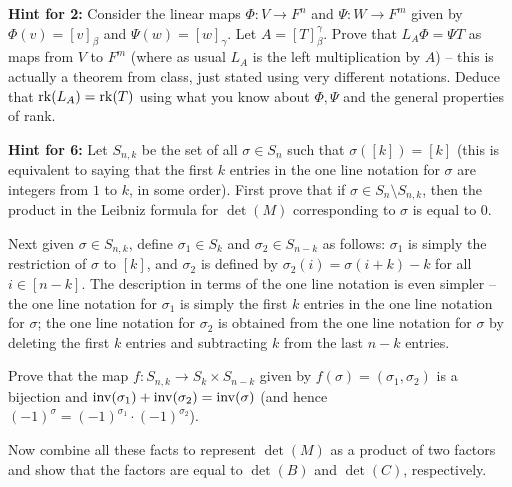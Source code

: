 \documentclass[11pt]{amsart}
\begin{document}
\newpage
{\bf Hint for 2:} Consider the linear maps $\Phi:V\to F^n$ and $\Psi: W\to F^m$ given by $\Phi(v)=[v]_{\beta}$
and $\Psi(w)=[w]_{\gamma}$. Let $A=[T]_{\beta}^{\gamma}$. Prove that $L_A\Phi=\Psi T$ as maps from $V$ to $F^m$
(where as usual $L_A$ is the left multiplication by $A$) -- this is actually a theorem from class, just stated using very different notations.
Deduce that ${\rm rk}(L_A)={\rm rk}(T)$ using what you know about $\Phi,\Psi$ and the general properties of rank.

\newpage
{\bf Hint for 6:} Let $S_{n,k}$ be the set of all $\sigma\in S_n$ such that $\sigma([k])=[k]$ (this is equivalent
to saying that the first $k$ entries in the one line notation for $\sigma$ are integers from $1$ to $k$, in some order).
First prove that if $\sigma\in S_n\setminus S_{n,k}$, then the product in the Leibniz formula for $\det(M)$
corresponding to $\sigma$ is equal to $0$. 

Next given $\sigma\in S_{n,k}$, define $\sigma_1\in S_k$ and $\sigma_2\in S_{n-k}$ as follows: $\sigma_1$
is simply the restriction of $\sigma$ to $[k]$, and $\sigma_2$ is defined by $\sigma_2(i)=\sigma(i+k)-k$ for all $i\in [n-k]$.
The description in terms of the one line notation is even simpler -- the one line notation for $\sigma_1$ is simply
the first $k$ entries in the one line notation for $\sigma$; the one line notation for $\sigma_2$ is
obtained from the one line notation for $\sigma$ by deleting the first $k$ entries and subtracting $k$ from the last
$n-k$ entries.

Prove that the map $f: S_{n,k}\to S_k\times S_{n-k}$ given by $f(\sigma)=(\sigma_1,\sigma_2)$ is a bijection and
${\rm inv}(\sigma_1)+{\rm inv}(\sigma_2)={\rm inv}(\sigma)$ (and hence $(-1)^{\sigma}=(-1)^{\sigma_1}\cdot (-1)^{\sigma_2}$).

Now combine all these facts to represent $\det(M)$ as a product of two factors and show that the factors are equal
to $\det(B)$ and $\det(C)$, respectively.
\end{document}
